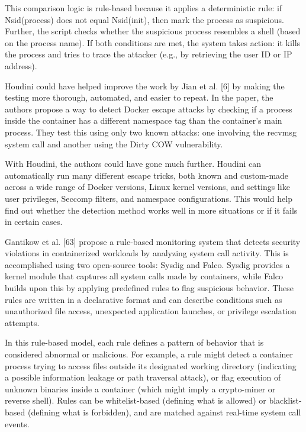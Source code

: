 \documentclass[12pt]{report}
\begin{document}
\begin{doublespace}
This comparison logic is rule-based because it applies a deterministic rule: if Nsid(process) does not equal Nsid(init), then mark the process as suspicious. Further, the script checks whether the suspicious process resembles a shell (based on the process name). If both conditions are met, the system takes action: it kills the process and tries to trace the attacker (e.g., by retrieving the user ID or IP address).

Houdini could have helped improve the work by Jian et al. [6] by making the testing more thorough, automated, and easier to repeat. In the paper, the authors propose a way to detect Docker escape attacks by checking if a process inside the container has a different namespace tag than the container’s main process. They test this using only two known attacks: one involving the recvmsg system call and another using the Dirty COW vulnerability.

With Houdini, the authors could have gone much further. Houdini can automatically run many different escape tricks, both known and custom-made across a wide range of Docker versions, Linux kernel versions, and settings like user privileges, Seccomp filters, and namespace configurations. This would help find out whether the detection method works well in more situations or if it fails in certain cases.

Gantikow et al. [63] propose a rule-based monitoring system that detects security violations in containerized workloads by analyzing system call activity. This is accomplished using two open-source tools: Sysdig and Falco. Sysdig provides a kernel module that captures all system calls made by containers, while Falco builds upon this by applying predefined rules to flag suspicious behavior. These rules are written in a declarative format and can describe conditions such as unauthorized file access, unexpected application launches, or privilege escalation attempts.

In this rule-based model, each rule defines a pattern of behavior that is considered abnormal or malicious. For example, a rule might detect a container process trying to access files outside its designated working directory (indicating a possible information leakage or path traversal attack), or flag execution of unknown binaries inside a container (which might imply a crypto-miner or reverse shell). Rules can be whitelist-based (defining what is allowed) or blacklist-based (defining what is forbidden), and are matched against real-time system call events.


\end{doublespace}
\end{document}

